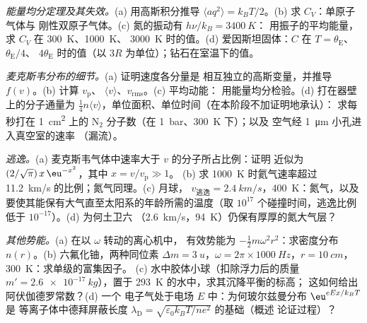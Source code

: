 \begin{exercise}[$\star\star$]\label{exo:b2:boltzmann-factor:7}
\emph{能量均分定理及其失效。}(a) 用高斯积分推导 $\langle aq^2\rangle =
k_BT/2$。(b) 求 $C_V$：单原子气体与
刚性双原子气体。(c) 氮的振动有 $h\nu/k_B = \qty{3400}{K}$：
用振子的平均能量，求 $C_V$ 在 \qty{300}{K}、\qty{1000}{K}、
\qty{3000}{K} 时的值。(d) 爱因斯坦固体：$C$ 在 $T = \theta_{\text{E}}$、$\theta_{\text{E}}/4$、
$4\theta_{\text{E}}$ 时的值（以 $3R$ 为单位）；钻石在室温下的值。
\end{exercise}

\begin{exercise}[$\star\star$]\label{exo:b2:boltzmann-factor:8}
\emph{麦克斯韦分布的细节。}(a) 证明速度各分量是
相互独立的高斯变量，并推导 $f(v)$。(b) 计算 $v_{\text{p}}$、
$\langle v\rangle$、$v_{\text{rms}}$。(c) 平均动能：
用能量均分检验。(d) 打在器壁上的分子通量为
$\tfrac14n\langle v\rangle$，单位面积、单位时间（在本阶段不加证明地承认）：
求每秒打在 \qty{1}{cm^2} 上的 N$_2$ 分子数（在 \qty{1}{bar}、\qty{300}{K} 下）；以及
空气经 \qty{1}{\micro m} 小孔进入真空室的速率
（漏流）。
\end{exercise}

\begin{exercise}[$\star\star$]\label{exo:b2:boltzmann-factor:9}
\emph{逃逸。}(a) 麦克斯韦气体中速率大于 $v$ 的分子所占比例：证明
近似为 $(2/\sqrt\pi)\,x\,\eu^{-x^2}$，其中 $x = v/v_{\text{p}} \gg 1$。
(b) 求 \qty{1000}{K} 时氦气速率超过 \qty{11.2}{km/s} 的比例；氮气同理。(c) 月球，
$v_{\text{逃逸}} = \qty{2.4}{km/s}$，\qty{400}{K}：氮气，以及
要使其能保有大气直至太阳系的年龄所需的温度（取 $10^{17}$
个碰撞时间，逃逸比例低于 $10^{-17}$）。(d) 为何土卫六
（\qty{2.6}{km/s}，\qty{94}{K}）仍保有厚厚的氮大气层？
\end{exercise}

\begin{exercise}[$\star\star\star$]\label{exo:b2:boltzmann-factor:10}
\emph{其他势能。}(a) 在以 $\omega$ 转动的离心机中，
有效势能为 $-\tfrac12m\omega^2r^2$：求密度分布
$n(r)$。(b) 六氟化铀，两种同位素 $\Delta m = \qty{3}{u}$，$\omega
= 2\pi \times \qty{1000}{Hz}$，$r = \qty{10}{cm}$，\qty{300}{K}：求单级的富集因子。
(c) 水中胶体小球（扣除浮力后的质量 $m' =
\qty{2.6e-17}{kg}$），置于 \qty{293}{K} 的水中，求其沉降平衡的标高；
这如何给出阿伏伽德罗常数？(d) 一个
电子气处于电场 $E$ 中：为何玻尔兹曼分布
$\eu^{eEx/k_BT}$ 是
等离子体中德拜屏蔽长度 $\lambda_{\text{D}} = \sqrt{\varepsilon_0k_BT/ne^2}$ 的基础（概述
论证过程）？
\end{exercise}

